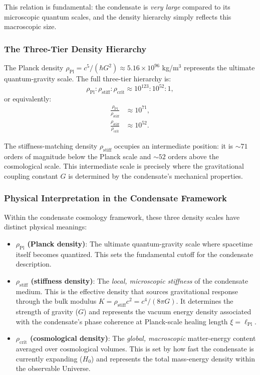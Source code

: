 \documentclass[11pt,a4paper]{article}
\newcommand{\rhocrit}{\rho_{\mathrm{crit}}}
\newcommand{\rhostiff}{\rho_{\mathrm{stiff}}}
\newcommand{\rhoPl}{\rho_{\mathrm{Pl}}}
\newcommand{\lPl}{\ell_{\mathrm{Pl}}}
\theoremstyle{definition}
\begin{document}
This relation is fundamental: the condensate is \emph{very large} compared to its microscopic quantum scales, and the density hierarchy simply reflects this macroscopic size.

\subsubsection{The Three-Tier Density Hierarchy}
\label{sec:three_tier}

The Planck density $\rhoPl = c^5/(\hbar G^2) \approx 5.16 \times 10^{96}$ kg/m$^3$ represents the ultimate quantum-gravity scale. The full three-tier hierarchy is:
\begin{equation}
\label{eq:hierarchy}
\rhoPl : \rhostiff : \rhocrit \approx 10^{123} : 10^{52} : 1,
\end{equation}
or equivalently:
\begin{align}
\label{eq:hierarchy_ratios}
\frac{\rhoPl}{\rhostiff} &\approx 10^{71}, \\
\frac{\rhostiff}{\rhocrit} &\approx 10^{52}.
\end{align}

The stiffness-matching density $\rhostiff$ occupies an intermediate position: it is $\sim 71$ orders of magnitude below the Planck scale and $\sim 52$ orders above the cosmological scale. This intermediate scale is precisely where the gravitational coupling constant $G$ is determined by the condensate's mechanical properties.

\subsubsection{Physical Interpretation in the Condensate Framework}
\label{sec:hierarchy_interpretation}

Within the condensate cosmology framework, these three density scales have distinct physical meanings:

\begin{itemize}[leftmargin=1.8em]
  \item \textbf{$\rhoPl$ (Planck density)}: The ultimate quantum-gravity scale where spacetime itself becomes quantized. This sets the fundamental cutoff for the condensate description.

  \item \textbf{$\rhostiff$ (stiffness density)}: The \emph{local, microscopic stiffness} of the condensate medium. This is the effective density that sources gravitational response through the bulk modulus $K = \rhostiff c^2 = c^4/(8\pi G)$. It determines the strength of gravity ($G$) and represents the vacuum energy density associated with the condensate's phase coherence at Planck-scale healing length $\xi = \lPl$.

  \item \textbf{$\rhocrit$ (cosmological density)}: The \emph{global, macroscopic} matter-energy content averaged over cosmological volumes. This is set by how fast the condensate is currently expanding ($H_0$) and represents the total mass-energy density within the observable Universe.
\end{itemize}
\end{document}

